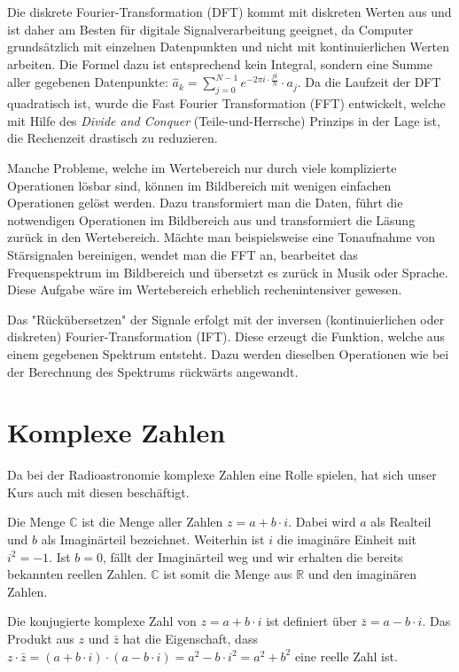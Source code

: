 \documentclass[]{dsadokumentation}
\begin{document}
Die diskrete Fourier-Transformation (DFT) kommt mit diskreten Werten aus und ist daher am Besten für digitale Signalverarbeitung geeignet, da Computer grundsätzlich mit einzelnen Datenpunkten und nicht mit kontinuierlichen Werten arbeiten. Die Formel dazu ist entsprechend kein Integral, sondern eine Summe aller gegebenen Datenpunkte: $\hat a_k = \sum\limits_{j=0}^{N-1}e^{-2\pi i\cdot\frac{jk}{N}}\cdot a_j$. Da die Laufzeit der DFT quadratisch ist, wurde die Fast Fourier Transformation (FFT) entwickelt, welche mit Hilfe des \emph{Divide and Conquer} (Teile-und-Herrsche) Prinzips in der Lage ist, die Rechenzeit drastisch zu reduzieren.

Manche Probleme, welche im Wertebereich nur durch viele komplizierte Operationen l\"osbar sind, k\"onnen im Bildbereich mit wenigen einfachen Operationen gel\"ost werden. Dazu transformiert man die Daten, führt die notwendigen Operationen im Bildbereich aus und transformiert die Läsung zurück in den Wertebereich. Mächte man beispielsweise eine Tonaufnahme von Stärsignalen bereinigen, wendet man die FFT an, bearbeitet das Frequenspektrum im Bildbereich und übersetzt es zurück in Musik oder Sprache. Diese Aufgabe w\"are im Wertebereich erheblich rechenintensiver gewesen.

Das "Rückübersetzen" der Signale erfolgt mit der inversen (kontinuierlichen oder diskreten) Fourier-Transformation (IFT). Diese erzeugt die Funktion, welche aus einem gegebenen Spektrum entsteht. Dazu werden dieselben Operationen wie bei der Berechnung des Spektrums rückwärts angewandt.

\section{Komplexe Zahlen}

Da bei der Radioastronomie komplexe Zahlen eine Rolle spielen, hat sich unser Kurs auch mit diesen beschäftigt.

Die Menge $\mathbb{C}$ ist die Menge aller Zahlen $z=a+b\cdot i$. Dabei wird $a$ als Realteil und $b$ als Imaginärteil bezeichnet. Weiterhin ist $i$ die imagin\"are Einheit mit $i^{2} = -1$. Ist $b = 0$, fällt der Imaginärteil weg und wir erhalten die bereits bekannten reellen Zahlen. $\mathbb{C}$ ist somit die Menge aus $\mathbb{R}$ und den imaginären Zahlen.

Die konjugierte komplexe Zahl von $z=a+b\cdot i$ ist definiert über $\bar{z}=a-b\cdot i$. Das Produkt aus $z$ und $\bar{z}$ hat die Eigenschaft, dass $z\cdot \bar{z}=(a+b\cdot i)\cdot (a-b\cdot i)=a^2-b\cdot i^2=a^2+b^2$ eine reelle Zahl ist.
\end{document}
